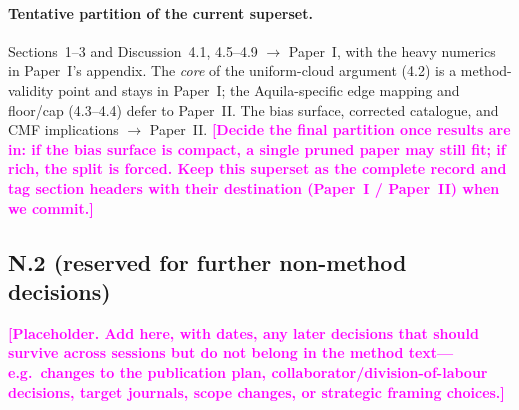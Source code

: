 \documentclass[11pt,a4paper]{article}
\newcommand{\note}[1]{\textcolor{magenta}{\textbf{[#1]}}}
\begin{document}
\paragraph{Tentative partition of the current superset.}
Sections~1--3 and Discussion~4.1, 4.5--4.9 $\rightarrow$ Paper~I, with the
heavy numerics in Paper~I's appendix. The \emph{core} of the uniform-cloud
argument (4.2) is a method-validity point and stays in Paper~I; the
Aquila-specific edge mapping and floor/cap (4.3--4.4) defer to Paper~II.
The bias surface, corrected catalogue, and CMF implications $\rightarrow$
Paper~II. \note{Decide the final partition once results are in: if the bias
surface is compact, a single pruned paper may still fit; if rich, the split
is forced. Keep this superset as the complete record and tag section headers
with their destination (Paper~I / Paper~II) when we commit.}

\subsection*{N.2 \quad (reserved for further non-method decisions)}

\note{Placeholder. Add here, with dates, any later decisions that should
survive across sessions but do not belong in the method text---e.g.\ changes
to the publication plan, collaborator/division-of-labour decisions, target
journals, scope changes, or strategic framing choices.}
\end{document}
